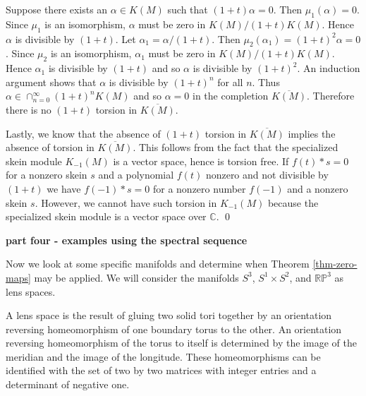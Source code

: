 \documentclass{slides}
\newcommand{\bbc}{\mathbb{C}}
\begin{document}
\begin{slide}
Suppose there exists an $\alpha \in K(M)$ such that $(1+t) \alpha = 0$.
Then $\mu_1(\alpha) = 0$.
Since $\mu_1$ is an isomorphism, $\alpha$ must be zero in $K(M) / (1+t) K(M)$.
Hence $\alpha$ is divisible by $(1+t)$.
Let $\alpha_1 = \alpha / (1+t)$.  Then
$\mu_2(\alpha_1) = (1+t)^2 \alpha = 0$.  Since $\mu_2$ is an isomorphism, $\alpha_1$
must be zero in $K(M) / (1+t) K(M)$.  Hence $\alpha_1$ is divisible by $(1+t)$ and so
$\alpha$ is divisible by $(1+t)^2$.  An induction argument shows that
$\alpha$ is divisible by $(1+t)^n$ for all $n$.  Thus
$\alpha \in \cap_{n=0}^{\infty} (1+t)^n K(M)$
and so $\alpha = 0$ in the completion $\overline{K(M)}$.
Therefore there is no $(1+t)$ torsion in $\overline{K(M)}$.
\end{slide}

\begin{slide}
Lastly, we know that the absence of $(1+t)$ torsion in
$\overline{K(M)}$ implies the absence of torsion in $\overline{K(M)}$.  This
follows from the fact that the specialized skein module
$K_{-1}(M)$ is a vector space, hence is torsion free.
If $f(t)*s = 0$ for a nonzero skein $s$ and a 
polynomial $f(t)$ nonzero and not divisible by $(1+t)$ we
have $f(-1)*s = 0$ for a nonzero number $f(-1)$ and a
nonzero skein $s$.  However, we cannot have such torsion
in $K_{-1}(M)$ because the specialized skein module is
a vector space over $\bbc$.
\qed
\end{slide}

\begin{slide}
\textbf{part four - examples using the spectral sequence}

Now we look at some specific manifolds and
determine when Theorem \ref{thm-zero-maps} may be applied.
We will consider the manifolds $S^3$, $S^1 \times S^2$, and
$\mathbb{RP}^3$ as lens spaces.

A lens space is the result of
gluing two solid tori together by an
orientation reversing homeomorphism of one boundary torus to
the other.  An orientation reversing  homeomorphism
of the torus to itself is determined by the image of the meridian
and the image of the longitude.
These homeomorphisms can be identified with the set of
two by two matrices with integer entries and a determinant
of negative one.
\end{slide}
\end{document}

